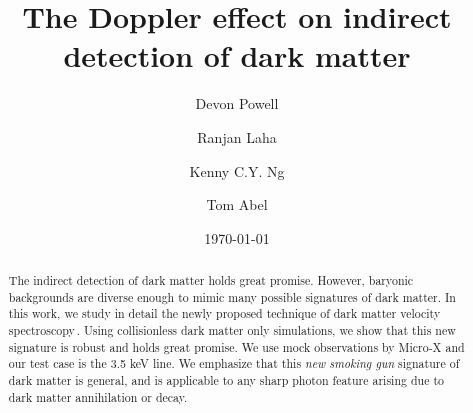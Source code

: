 \documentclass[aps,prd,10pt,twocolumn,superscriptaddress,showpacs]{revtex4-1}
\begin{document}
\title{The Doppler effect on indirect detection of dark matter}
\author{Devon Powell}
\author{Ranjan Laha}
\author{Kenny C.Y. Ng}
\author{Tom Abel}
\date{\today}

\begin{abstract}
The indirect detection of dark matter holds great promise.  However, baryonic backgrounds are diverse enough to mimic many possible signatures of dark matter.  In this work, we study in detail the newly proposed technique of dark matter velocity spectroscopy\,\cite{speckhard2016}.  Using collisionless dark matter only simulations, we show that this new signature is robust and holds great promise.  We use mock observations by Micro-X and our test case is the 3.5 keV line.  We emphasize that this {\it new smoking gun} signature of dark matter is general, and is applicable to any sharp photon feature arising due to dark matter annihilation or decay.
\end{abstract}


\maketitle


\end{document}

